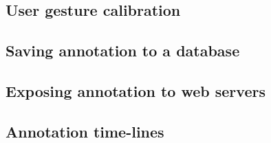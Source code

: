 \subsection{User gesture calibration}

\subsection{Saving annotation to a database}

\subsection{Exposing annotation to web servers}

\subsection{Annotation time-lines}


% 
% 
% 


